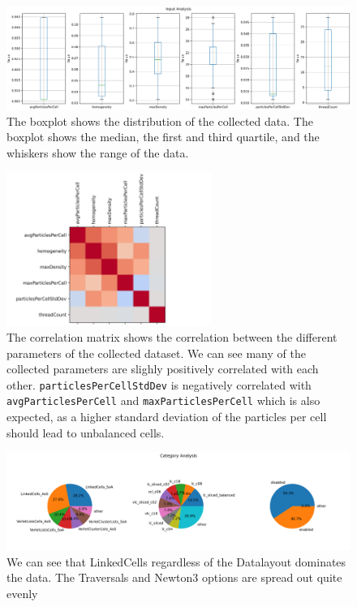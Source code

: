 \begin{figure}[H]
    \centering
    \includegraphics[width=\columnwidth,trim={0 0 0 0.5cm},clip]{figures/DataAnalytics/input_analysis.png}
    \caption[Boxplot of the collected Dataset]{The boxplot shows the distribution of the collected data. The boxplot shows the median, the first and third quartile, and the whiskers show the range of the data.}

    \label{fig:inputAnalysisBoxplot}
\end{figure}

\begin{figure}[H]
    \centering
    \includegraphics[height=5cm,trim={0cm 0 2cm 0cm},clip]{figures/DataAnalytics/correlation_matrix.png}
    \caption[Correlation Matrix of the collected Dataset]{The correlation matrix shows the correlation between the different parameters of the collected dataset. We can see many of the collected parameters are slighly positively correlated with each other. \texttt{particlesPerCellStdDev} is negatively correlated with \texttt{avgParticlesPerCell} and \texttt{maxParticlesPerCell} which is also expected, as a higher standard deviation of the particles per cell should lead to unbalanced cells.}
    \label{fig:corrMatrix}
\end{figure}

\begin{figure}[H]
    \centering
    \includegraphics[width=\columnwidth,trim={1cm 2cm 2cm 2cm},clip]{figures/DataAnalytics/traversal_pie_chart.png}
    \caption[Pi Charts of nominal values of the collected Dataset]{ We can see that LinkedCells regardless of the Datalayout dominates the data. The Traversals and Newton3 options are spread out quite evenly}
    \label{fig:inputAnalysisPiChart}
\end{figure}


